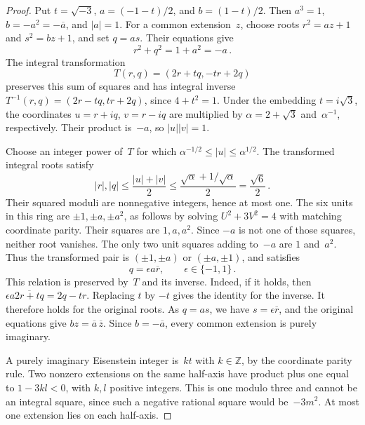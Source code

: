 \documentclass[12pt]{article}
\numberwithin{equation}{section}
\begin{document}
\begin{proof}
Put $t=\sqrt{-3}$, $a=(-1-t)/2$, and $b=(1-t)/2$. Then $a^3=1$, $b=-a^2=-\overline a$, and $|a|=1$. For a common extension~$z$, choose roots $r^2=az+1$ and $s^2=bz+1$, and set $q=as$. Their equations give
\begin{equation*}
 r^2+q^2=1+a^2=-a\,.
\end{equation*}
The integral transformation
\begin{equation*}
 T(r,q)=(2r+tq,-tr+2q)
\end{equation*}
preserves this sum of squares and has integral inverse $T^{-1}(r,q)=(2r-tq,tr+2q)$, since $4+t^2=1$. Under the embedding $t=i\sqrt3$, the coordinates $u=r+iq$, $v=r-iq$ are multiplied by $\alpha=2+\sqrt3$ and~$\alpha^{-1}$, respectively. Their product is~$-a$, so $|u||v|=1$.

Choose an integer power of~$T$ for which $\alpha^{-1/2}\le|u|\le\alpha^{1/2}$. The transformed integral roots satisfy
\begin{equation*}
 |r|,|q|\le\frac{|u|+|v|}{2}
 \le\frac{\sqrt\alpha+1/\sqrt\alpha}{2}=\frac{\sqrt6}{2}\,.
\end{equation*}
Their squared moduli are nonnegative integers, hence at most one. The six units in this ring are $\pm1,\pm a,\pm a^2$, as follows by solving $U^2+3V^2=4$ with matching coordinate parity. Their squares are $1,a,a^2$. Since $-a$ is not one of those squares, neither root vanishes. The only two unit squares adding to~$-a$ are $1$ and~$a^2$. Thus the transformed pair is $(\pm1,\pm a)$ or $(\pm a,\pm1)$, and satisfies
\begin{equation*}
 q=\epsilon a\overline r,\qquad\epsilon\in\{-1,1\}\,.
\end{equation*}
This relation is preserved by~$T$ and its inverse. Indeed, if it holds, then $\epsilon a\overline{2r+tq}=2q-tr$. Replacing $t$ by $-t$ gives the identity for the inverse. It therefore holds for the original roots. As $q=as$, we have $s=\epsilon\overline r$, and the original equations give $bz=\overline a\,\overline z$. Since $b=-\overline a$, every common extension is purely imaginary.

A purely imaginary Eisenstein integer is~$kt$ with $k\in\mathbb Z$, by the coordinate parity rule. Two nonzero extensions on the same half-axis have product plus one equal to $1-3kl<0$, with $k,l$ positive integers. This is one modulo three and cannot be an integral square, since such a negative rational square would be~$-3m^2$. At most one extension lies on each half-axis.
\end{proof}
\end{document}
